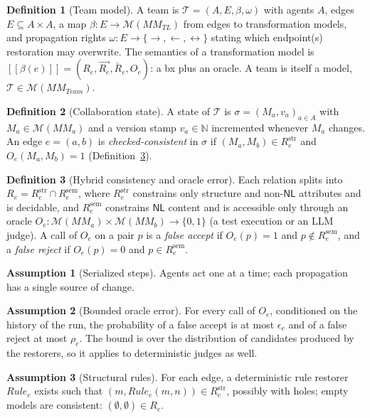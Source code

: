 \documentclass[10pt, anonymous, conference]{IEEEtran}
\theoremstyle{definition}
\newtheorem{definition}{Definition}[section]
\newtheorem{assumption}{Assumption}
\theoremstyle{plain}
\theoremstyle{remark}
\newcommand{\MM}{\mathit{MM}}
\newcommand{\Mods}[1]{\mathcal{M}(#1)}
\newcommand{\TL}{\mathit{TL}}
\newcommand{\Team}{\mathit{Team}}
\newcommand{\team}{\mathcal{T}}
\newcommand{\fwd}[1]{\overrightarrow{#1}}
\newcommand{\bwd}[1]{\overleftarrow{#1}}
\newcommand{\str}{\mathrm{str}}
\newcommand{\sem}{\mathrm{sem}}
\newcommand{\NL}{\mathsf{NL}}
\newcommand{\den}[1]{[\![#1]\!]}
\begin{document}
\begin{definition}[Team model]\label{def:team}
A team is $\team=(A,E,\beta,\omega)$ with agents $A$, edges $E\subseteq
A\times A$, a map $\beta\colon E\to\Mods{\MM_{\TL}}$ from edges to
transformation models, and propagation rights $\omega\colon
E\to\{\rightarrow,\leftarrow,\leftrightarrow\}$ stating which endpoint(s)
restoration may overwrite. The semantics of a transformation model is
$\den{\beta(e)}=(R_e,\fwd{R_e},\bwd{R_e},O_e)$: a bx plus an oracle. A team is
itself a model, $\team\in\Mods{\MM_{\Team}}$.
\end{definition}

\begin{definition}[Collaboration state]\label{def:state}
A state of $\team$ is $\sigma=(M_a,v_a)_{a\in A}$ with $M_a\in\Mods{\MM_a}$
and a version stamp $v_a\in\mathbb{N}$ incremented whenever $M_a$ changes. An
edge $e=(a,b)$ is \emph{checked-consistent} in $\sigma$ if
$(M_a,M_b)\in R_e^{\str}$ and $O_e(M_a,M_b)=1$ (Definition~\ref{def:hybrid}).
\end{definition}

\begin{definition}[Hybrid consistency and oracle error]\label{def:hybrid}
Each relation splits into $R_e=R_e^{\str}\cap R_e^{\sem}$, where $R_e^{\str}$
constrains only structure and non-$\NL$ attributes and is decidable, and
$R_e^{\sem}$ constrains $\NL$ content and is accessible only through an oracle
$O_e\colon\Mods{\MM_a}\times\Mods{\MM_b}\to\{0,1\}$ (a test execution or an
LLM judge). A call of $O_e$ on a pair $p$ is a \emph{false accept} if
$O_e(p)=1$ and $p\notin R_e^{\sem}$, and a \emph{false reject} if $O_e(p)=0$
and $p\in R_e^{\sem}$.
\end{definition}

\begin{assumption}[Serialized steps]\label{as:serial}
Agents act one at a time; each propagation has a single source of change.
\end{assumption}
\begin{assumption}[Bounded oracle error]\label{as:oracle}
For every call of $O_e$, conditioned on the history of the run, the
probability of a false accept is at most $\epsilon_e$ and of a false reject at
most $\rho_e$. The bound is over the distribution of candidates produced by the
restorers, so it applies to deterministic judges as well.
\end{assumption}
\begin{assumption}[Structural rules]\label{as:rules}
For each edge, a deterministic rule restorer $\mathit{Rule}_e$ exists such
that $(m,\mathit{Rule}_e(m,n))\in R_e^{\str}$, possibly with holes; empty
models are consistent: $(\emptyset,\emptyset)\in R_e$.
\end{assumption}
\end{document}

